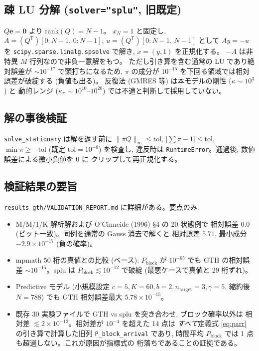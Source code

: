 \documentclass[a4paper,11pt]{article}
\newcommand{\code}[1]{\texttt{#1}}
\newcommand{\blk}{\mathrm{block}}
\begin{document}
\subsection{疎 LU 分解 (\code{solver="splu"}, 旧既定)}

$Q\mathbf{e}=\mathbf{0}$ より $\mathrm{rank}(Q)=N-1$。
$x_N=1$ と固定し, $A=(Q^{\mathsf T})[0{:}N-1,\,0{:}N-1]$,
$u=(Q^{\mathsf T})[0{:}N-1,\,N-1]$ として $Ay=-u$ を
\code{scipy.sparse.linalg.spsolve} で解き, $x=(y,1)$ を正規化する。
$-A$ は非特異 $M$ 行列なので非負一意解をもつ。
ただし引き算を含む通常の LU であり絶対誤差が $\sim10^{-17}$ で頭打ちになるため,
$\pi$ の成分が $10^{-15}$ を下回る領域では相対誤差が破綻する (負値も出る)。
反復法 (GMRES 等) は本モデルの剛性 ($\kappa\sim10^3$) と
動的レンジ ($\kappa_\pi\sim10^{10}$--$10^{20}$) では不適と判断して採用していない。

\subsection{解の事後検証}

\code{solve\_stationary} は解を返す前に
$\|\pi Q\|_\infty\le \mathrm{tol}$, $|\sum\pi-1|\le\mathrm{tol}$,
$\min\pi\ge-\mathrm{tol}$ (既定 $\mathrm{tol}=10^{-8}$) を検査し,
違反時は \code{RuntimeError}。通過後, 数値誤差による微小負値を $0$ に
クリップして再正規化する。

\subsection{検証結果の要旨}

\code{results\_gth/VALIDATION\_REPORT.md} に詳細がある。要点のみ:
\begin{itemize}
  \item M/M/1/K 解析解および O'Cinneide (1996) \S4 の 20 状態例で
        相対誤差 $0.0$ (ビット一致)。同例を通常の Gauss 消去で解くと
        相対誤差 $5.71$, 最小成分 $-2.9\times10^{-17}$ (負の確率)。
  \item mpmath 50 桁の真値との比較 (ベース): $P_\blk$ が $10^{-65}$ でも
        GTH の相対誤差 $\sim10^{-15}$。splu は $P_\blk\lesssim10^{-12}$ で破綻
        (最悪ケースで真値と 29 桁ずれ)。
  \item Predictive モデル (小規模設定 $c=5,K=60,b=2,n_{\mathrm{target}}=3,\gamma=5$,
        縮約後 $N=788$) でも GTH 相対誤差最大 $5.78\times10^{-15}$。
  \item 既存 30 実験ファイルで GTH vs splu を突き合わせ, ブロック確率以外は
        相対差 $\lesssim2\times10^{-12}$。相対差が $10^{-4}$ を超えた 14 点は
        \emph{すべて}定義式 \eqref{eq:parr} の引き算で計算した旧列
        \code{P\_block\_arrival} であり,
        時間平均 $P_\blk$ では 1 点も超過しない。これが原因が指標式の
        桁落ちであることの証拠である。
\end{itemize}
\end{document}
